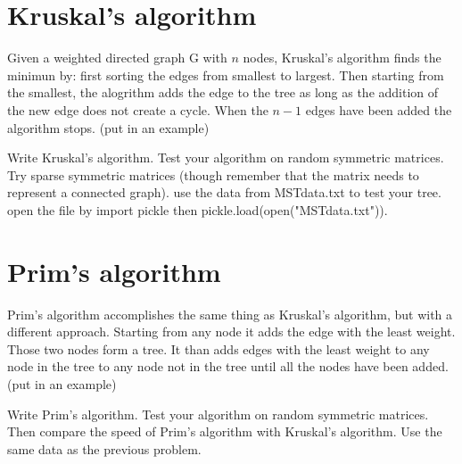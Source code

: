 \section*{Kruskal's algorithm}

Given a weighted directed graph G with $n$ nodes, Kruskal's algorithm finds the minimun by: first sorting the edges from smallest to largest. Then starting from the smallest, the alogrithm adds the edge to the tree as long as the addition of the new edge does not create a cycle. When the $n-1$ edges have been added the algorithm stops. (put in an example)

\begin{problem}
Write Kruskal's algorithm. Test your algorithm on random symmetric matrices. Try sparse symmetric matrices (though remember that the matrix needs to represent a connected graph). use the data from MSTdata.txt to test your tree. open the file by import pickle then pickle.load(open("MSTdata.txt")).
\end{problem}

\section*{Prim's algorithm}

Prim's algorithm accomplishes the same thing as Kruskal's algorithm, but with a different approach. Starting from any node it adds the edge with the least weight. Those two nodes form a tree. It than adds edges with the least weight to any node in the tree to any node not in the tree until all the nodes have been added. (put in an example)

\begin{problem}
Write Prim's algorithm. Test your algorithm on random symmetric matrices. Then compare the speed of Prim's algorithm with Kruskal's algorithm. Use the same data as the previous problem. 
\end{problem}
